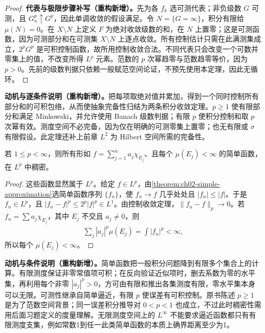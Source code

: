 \documentclass[../../main.tex]{subfiles}
\begin{document}
\begin{proof}
\textbf{代表与极限步骤补写（重构新增）。}先为各 $f_k$ 选可测代表；非负级数 $G$ 可测，且 $G_n^p\uparrow G^p$，因此单调收敛的假设满足。令 $N=\{G=\infty\}$，积分有限给 $\mu(N)=0$。在 $X\setminus N$ 上定义 $F$ 为绝对收敛级数的和，在 $N$ 上置零；这是可测函数，因为可测部分和在可测集 $X\setminus N$ 上逐点收敛。所有控制估计只需在此满测集成立，$2^pG^p$ 是可积控制函数，故所用控制收敛合法。不同代表只会改变一个可数并零集上的值，不改变所得 $L^p$ 元素。范数的 $p$ 次幂趋零与范数趋零等价，因为 $p>0$。先前的级数判据只依赖一般赋范空间论证，不预先使用本定理，因此无循环。
\end{proof}
\begin{remark}
\textbf{动机与逐条件说明（重构新增）。}把每项取绝对值并累加，得到一个同时控制所有部分和的可积包络，从而使抽象完备性归结为两条积分收敛定理。$p\geqslant1$ 使有限部分和满足 Minkowski，并允许使用 Banach 级数判据；有限 $p$ 使积分控制和取 $p$ 次幂有效。测度空间不必完备，因为仅在明确的可测零集上置零；也无有限或 $\sigma$ 有限假设。此定理还补上前章 $L^2$ 为 Hilbert 空间所需的完备性。
\end{remark}
\begin{proposition}\label{proposition:ch06-simple-density}
若 $1\leqslant p<\infty$，则所有形如 $f=\sum_{j=1}^na_j\chi_{E_j}$、且每个 $\mu(E_j)<\infty$ 的简单函数，在 $L^p$ 中稠密。
\end{proposition}
\begin{proof}
这些函数显然属于 $L^p$。给定 $f\in L^p$，由\cref{theorem:ch02-simple-approximation}选简单函数序列 $\{f_n\}$，使 $f_n\to f$ 几乎处处且 $|f_n|\leqslant|f|$。于是 $f_n\in L^p$，且 $|f_n-f|^p\leqslant2^p|f|^p\in L^1$。由控制收敛定理，$\|f_n-f\|_p\to0$。若 $f_n=\sum a_j\chi_{E_j}$，其中 $E_j$ 不交且 $a_j\ne0$，则
\begin{align*}
\sum_j|a_j|^p\mu(E_j)=\int|f_n|^p<\infty,
\end{align*}
所以每个 $\mu(E_j)<\infty$。
\end{proof}
\begin{remark}
\textbf{动机与条件说明（重构新增）。}简单函数把一般积分问题降到有限多个集合上的计算。有限测度保证非零常值项可积；在反向验证近似项时，删去系数为零的水平集，再利用每个非零 $|a_j|^p>0$，方可由有限和推出各集测度有限，零水平集本身可以无限。可测性继承自简单逼近，有限 $p$ 使误差有可积控制。原书陈述 $p\geqslant1$ 是为了范数空间背景；同一误差积分推导对 $0<p<1$ 也成立，不过此时稠密性需用后面习题定义的度量理解。无限测度空间上的 $L^\infty$ 不能要求逼近函数都只有有限测度支集，例如常数1到任一此类简单函数的本质上确界距离至少为1。
\end{remark}
\end{document}

